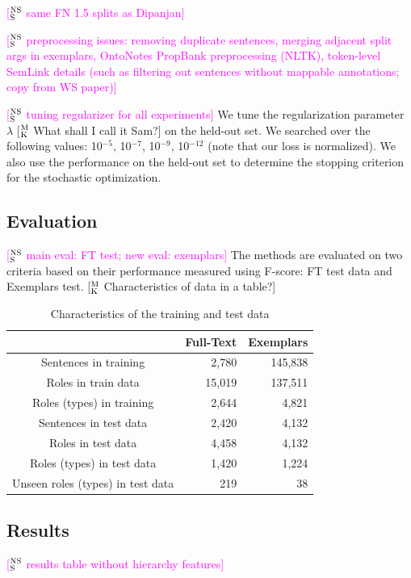 \documentclass[11pt,a4paper]{article}
\newcommand{\ensuretext}[1]{#1}
\newcommand{\nssmarker}{\ensuretext{\textcolor{magenta}{\ensuremath{^{\textsc{NS}}_{\textsc{S}}}}}}
\newcommand{\mkmarker}{\ensuretext{\textcolor{mdgreen}{\ensuremath{^{\textsc{M}}_{\textsc{K}}}}}}
\newcommand{\arkcomment}[3]{\ensuretext{\textcolor{#3}{[#1 #2]}}}
\newcommand{\nss}[1]{\arkcomment{\nssmarker}{#1}{magenta}}
\newcommand{\mk}[1]{\arkcomment{\mkmarker}{#1}{mdgreen}}
\begin{document}
\nss{same FN 1.5 splits as Dipanjan}


\nss{preprocessing issues: removing duplicate sentences, merging adjacent split args in exemplars, OntoNotes PropBank preprocessing (NLTK), token-level SemLink details (such as filtering out sentences without mappable annotations; copy from WS paper)}

\nss{tuning regularizer for all experiments}
We tune the regularization parameter $\lambda$ \mk{What shall I call it Sam?} on the held-out set. We searched over the following
values: 10$^{-5}$, 10$^{-7}$, 10$^{-9}$, 10$^{-12}$ (note that our loss is normalized).
We also use the performance on the held-out set to determine the stopping criterion for the stochastic optimization.




\subsection{Evaluation}

\nss{main eval: FT test; new eval: exemplars}
The methods are evaluated on two criteria based on their performance measured using F-score: FT test data and Exemplars test.
\mk{Characteristics of data in a table?}

\begin{table}\centering\small
\begin{tabular}{crr}
\toprule
\normalfont & \textbf{Full-Text} & \textbf{Exemplars} \\
\midrule
Sentences in training & 2,780 & 145,838 \\
Roles in train data & 15,019 & 137,511 \\
Roles (types) in training & 2,644 & 4,821 \\
Sentences in test data & 2,420 & 4,132 \\
Roles in test data & 4,458 & 4,132 \\
Roles (types) in test data & 1,420 & 1,224 \\
Unseen roles (types) in test data & 219 & 38 \\
\end{tabular}
\caption{Characteristics of the training and test data}
\end{table}


\subsection{Results}

\nss{results table without hierarchy features}
\end{document}
